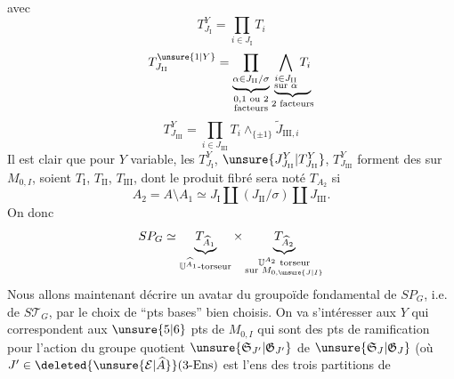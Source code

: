avec
\[
T_{J_{\mathrm{I}}}^Y=\prod_{i\in J_{\mathrm{I}}}T_i
\]
\[
T_{J_{\mathrm{II}}}^{\unsure{1|Y}}=
\underbrace{\prod_{\alpha\in J_{\mathrm{II}}/\sigma}}_{\substack{0,1\text{ ou }2\\\text{facteurs}}}
\underbrace{\bigwedge_{\substack{i\in J_{\mathrm{II}}\\\text{sur }\alpha}}T_i}_{2\text{ facteurs}}
\]
\[
T_{J_{\mathrm{III}}}^Y=\prod_{i\in J_{\mathrm{III}}}T_i\wedge_{\{\pm1\}}\widetilde{J}_{\mathrm{III},i}
\]
Il est clair que pour $Y$ variable, les $T_{J_{\mathrm{I}}}^Y$, $\unsure{J_{J_{\mathrm{II}}}^Y|T_{J_{\mathrm{II}}}^Y}$, $T_{J_{\mathrm{III}}}^Y$ forment des   sur $M_{0,I}$, soient $T_{\mathrm{I}}$, $T_{\mathrm{II}}$, $T_{\mathrm{III}}$, dont le produit fibré sera noté $T_{A_2}$ si
\[
A_2=A\setminus A_1\simeq J_{\mathrm{I}}\amalg(J_{\mathrm{II}}/\sigma)\amalg J_{\mathrm{III}}.
\]
On  donc
\[
SP_G\simeq
\underbrace{T_{\widehat{A}_1}}_{\mathbb{U}^{\widehat{A}_1}\text{-torseur}}
\times
\underbrace{T_{\widehat{A}_2}}_{\substack{\mathbb{U}^{A_2}\text{ torseur}\\\text{sur }M_{0,\unsure{J|I}}}}
\]
Nous allons maintenant décrire un avatar du groupoïde fondamental de $SP_G$, i.e. de $S\mathcal{T}_G$, par le choix de ``pts bases'' bien choisis. On va s'intéresser aux $Y$ qui correspondent aux $\unsure{5|6}$ pts de $M_{0,I}$ qui sont des pts de ramification pour l'action du groupe quotient $\unsure{\mathfrak{S}_{J'}|\mathfrak{G}_{J'}}$ de $\unsure{\mathfrak{S}_J|\mathfrak{G}_J}$ (où $J'\in\deleted{\unsure{\mathcal{E}|\widehat{A}}}(3\text{-Ens})$ est l'ens des trois partitions de
